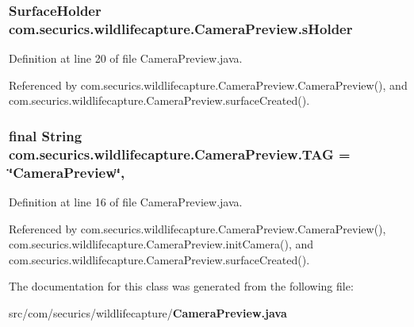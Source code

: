 \subsubsection[{s\+Holder}]{\setlength{\rightskip}{0pt plus 5cm}Surface\+Holder com.\+securics.\+wildlifecapture.\+Camera\+Preview.\+s\+Holder\hspace{0.3cm}{\ttfamily [private]}}\label{classcom_1_1securics_1_1wildlifecapture_1_1_camera_preview_af07f87b9a8ff4d898182999976bdd0d5}


Definition at line 20 of file Camera\+Preview.\+java.



Referenced by com.\+securics.\+wildlifecapture.\+Camera\+Preview.\+Camera\+Preview(), and com.\+securics.\+wildlifecapture.\+Camera\+Preview.\+surface\+Created().

\subsubsection[{T\+A\+G}]{\setlength{\rightskip}{0pt plus 5cm}final String com.\+securics.\+wildlifecapture.\+Camera\+Preview.\+T\+A\+G = \char`\"{}Camera\+Preview\char`\"{}\hspace{0.3cm}{\ttfamily [static]}, {\ttfamily [private]}}\label{classcom_1_1securics_1_1wildlifecapture_1_1_camera_preview_ada374cd3791b887dbbfc1ee7de9faacc}


Definition at line 16 of file Camera\+Preview.\+java.



Referenced by com.\+securics.\+wildlifecapture.\+Camera\+Preview.\+Camera\+Preview(), com.\+securics.\+wildlifecapture.\+Camera\+Preview.\+init\+Camera(), and com.\+securics.\+wildlifecapture.\+Camera\+Preview.\+surface\+Created().



The documentation for this class was generated from the following file\+:\begin{DoxyCompactItemize}
\item 
src/com/securics/wildlifecapture/{\bf Camera\+Preview.\+java}\end{DoxyCompactItemize}
